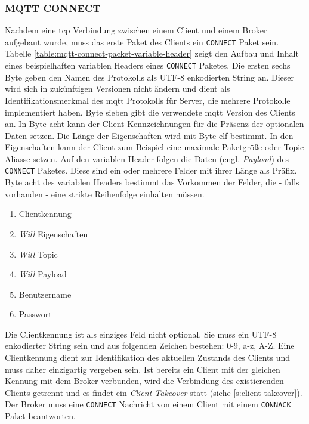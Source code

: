 \subsubsection{MQTT CONNECT} \label{s:mqtt-connect}
Nachdem eine \ac{tcp} Verbindung zwischen einem Client und einem Broker aufgebaut wurde, muss das erste Paket des Clients ein \verb|CONNECT| Paket sein.
Tabelle \ref{table:mqtt-connect-packet-variable-header} zeigt den Aufbau und Inhalt eines beispielhaften variablen Headers eines \verb|CONNECT| Paketes.
Die ersten sechs Byte geben den Namen des Protokolls als UTF-8 enkodierten String an. Dieser wird sich in zukünftigen Versionen nicht ändern und dient als Identifikationsmerkmal des \ac{mqtt} Protokolls für Server, die mehrere Protokolle implementiert haben. Byte sieben gibt die verwendete \ac{mqtt} Version des Clients an. In Byte acht kann der Client Kennzeichnungen für die Präsenz der optionalen Daten setzen. Die Länge der Eigenschaften wird mit Byte elf bestimmt. In den Eigenschaften kann der Client zum Beispiel eine maximale Paketgrö{\ss}e oder Topic Aliasse setzen.\cite{mqtt5Specification}
\newpage\noindent
Auf den variablen Header folgen die Daten (engl. \textit{Payload}) des \verb|CONNECT| Paketes. Diese sind ein oder mehrere Felder mit ihrer Länge als Präfix. Byte acht des variablen Headers bestimmt das Vorkommen der Felder, die - falls vorhanden - eine strikte Reihenfolge einhalten müssen.
\cite{mqtt5Specification}
\begin{enumerate}
    \item Clientkennung
    \item \textit{Will} Eigenschaften
    \item \textit{Will} Topic
    \item \textit{Will} Payload
    \item Benutzername
    \item Passwort
\end{enumerate}
Die Clientkennung ist als einziges Feld nicht optional. Sie muss ein UTF-8 enkodierter String sein und aus folgenden Zeichen bestehen: 0-9, a-z, A-Z.
Eine Clientkennung dient zur Identifikation des aktuellen Zustands des Clients und muss daher einzigartig vergeben sein. Ist bereits ein Client mit der gleichen Kennung mit dem Broker verbunden, wird die Verbindung des existierenden Clients getrennt und es findet ein \textit{Client-Takeover} statt (siehe \ref{s:client-takeover}).
Der Broker muss eine \verb|CONNECT| Nachricht von einem Client mit einem \verb|CONNACK| Paket beantworten.
\cite{mqtt5Specification}
